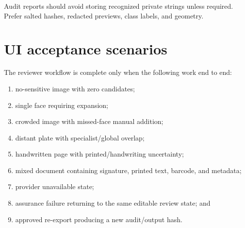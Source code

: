 Audit reports should avoid storing recognized private strings unless required. Prefer salted hashes, redacted previews, class labels, and geometry.

\section{UI acceptance scenarios}

The reviewer workflow is complete only when the following work end to end:

\begin{enumerate}[leftmargin=7mm]
  \item no-sensitive image with zero candidates;
  \item single face requiring expansion;
  \item crowded image with missed-face manual addition;
  \item distant plate with specialist/global overlap;
  \item handwritten page with printed/handwriting uncertainty;
  \item mixed document containing signature, printed text, barcode, and metadata;
  \item provider unavailable state;
  \item assurance failure returning to the same editable review state; and
  \item approved re-export producing a new audit/output hash.
\end{enumerate}
